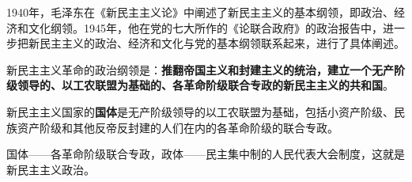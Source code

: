 1940年，毛泽东在{《新民主主义论》}中阐述了新民主主义的基本纲领，即政治、经济和文化纲领。1945年，他在党的七大所作的{《论联合政府》}的政治报告中，进一步把新民主主义的政治、经济和文化与党的基本纲领联系起来，进行了具体阐述。

新民主主义革命的政治纲领是：\textbf{{推翻帝国主义和封建主义的统治，建立一个无产阶级领导的、以工农联盟为基础的、各革命阶级联合专政的新民主主义的共和国}}。

新民主主义国家的\textbf{{国体}}是无产阶级领导的以工农联盟为基础，包括小资产阶级、民族资产阶级和其他反帝反封建的人们在内的各革命阶级的联合专政。

{国体------各革命阶级联合专政，政体------民主集中制的人民代表大会制度，这就是新民主主义政治}{。}
